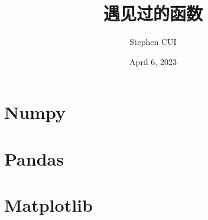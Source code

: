 \documentclass[openany]{book}
\title{遇见过的函数}
\author{Stephen CUI\orcidlink{0009-0008-2664-5882}}
\date{April 6, 2023}
\begin{document}
\part{Numpy}


\part{Pandas}
\part{Matplotlib}
\end{document}
